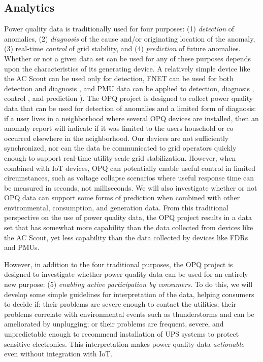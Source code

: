 \subsection{Analytics}

Power quality data is traditionally used for four purposes: (1) {\em detection} of anomalies, (2) {\em diagnosis} of the cause and/or originating location of the anomaly, (3) real-time {\em control} of grid stability, and (4) {\em prediction} of future anomalies. Whether or not a given data set can be used for any of these purposes depends upon the characteristics of its generating device. A relatively simple device like the AC Scout can be used only for detection, FNET can be used for both detection and diagnosis \cite{Markham2012}, and PMU data can be applied to detection, diagnosis \cite{Zhao2009}, control \cite{Liu2010}, and prediction \cite{Liu2009,Gao2012}). 
The OPQ project is designed to collect power quality data that can be used for detection of anomalies and a limited form of diagnosis: if a user lives in a neighborhood where several OPQ devices are installed, then an anomaly report will indicate if it was limited to the users household or co-occurred elsewhere in the neighborhood. Our devices are not sufficiently synchronized, nor can the data be communicated to grid operators quickly enough to support real-time utility-scale grid stabilization. However, when combined with IoT devices, OPQ can potentially enable useful control in limited circumstances, such as voltage collapse scenarios where useful response time can be measured in seconds, not milliseconds.  We will also investigate whether or not OPQ data can support some forms of prediction when combined with other environmental, consumption, and generation data. From this traditional perspective on the use of power quality data, the OPQ project results in a data set that has somewhat more capability than the data collected from devices like the AC Scout, yet less capability than the data collected by devices like FDRs and PMUs. 

However, in addition to the four traditional purposes, the OPQ project is designed to investigate whether power quality data can be used for an entirely new purpose: (5) {\em enabling active participation by consumers}. To do this, we will develop some simple guidelines for interpretation of the data, helping consumers to decide if: their problems are severe enough to contact the utilities; their problems correlate with environmental events such as thunderstorms and can be ameliorated by unplugging; or their problems are frequent, severe, and unpredictable enough to recommend installation of UPS systems to protect sensitive electronics.  This interpretation makes power quality data {\em actionable} even without integration with IoT.

